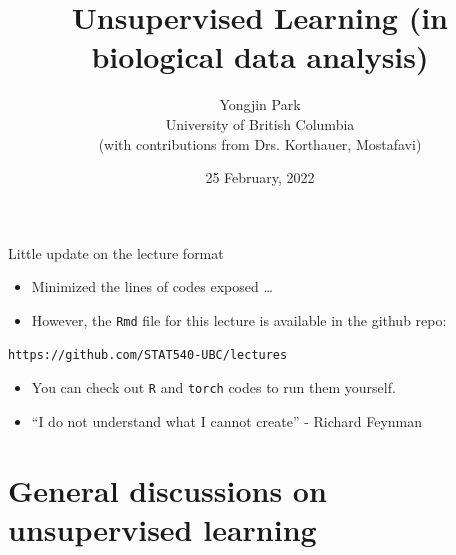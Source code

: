 \documentclass[
  ignorenonframetext,
  aspectratio=169]{beamer}
\title{Unsupervised Learning (in biological data analysis)}
\author{Yongjin Park\\
University of British Columbia\\
(with contributions from Drs. Korthauer, Mostafavi)}
\date{25 February, 2022}
\begin{document}
\frame{\titlepage}

\begin{frame}[fragile]{Little update on the lecture format}
\protect\hypertarget{little-update-on-the-lecture-format}{}
\begin{itemize}
\item
  Minimized the lines of codes exposed \ldots{}
\item
  However, the \texttt{Rmd} file for this lecture is available in the
  github repo:
\end{itemize}

\begin{verbatim}
https://github.com/STAT540-UBC/lectures
\end{verbatim}

\begin{itemize}
\item
  You can check out \texttt{R} and \texttt{torch} codes to run them
  yourself.
\item
  ``I do not understand what I cannot create'' - Richard Feynman
\end{itemize}
\end{frame}

\hypertarget{general-discussions-on-unsupervised-learning}{%
\section{General discussions on unsupervised
learning}\label{general-discussions-on-unsupervised-learning}}
\end{document}

